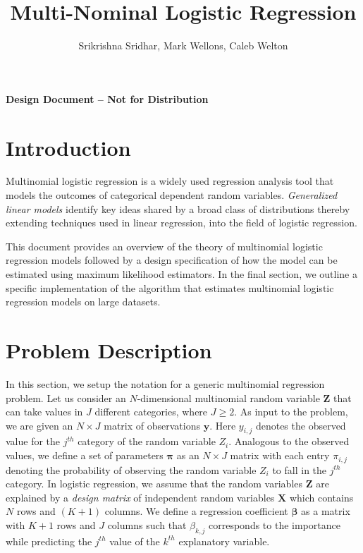 \documentclass[12pt]{article}
\author{Srikrishna Sridhar, Mark Wellons, Caleb Welton}
\title{Multi-Nominal Logistic Regression}
\newcommand{\bS}[1] {\boldsymbol  #1}
\begin{document}
\maketitle
\large
\begin{center}
{\sc \bf Design Document -- Not for Distribution}
\end{center}
\normalsize

 \section{Introduction}\label{sec:intro}
Multinomial logistic regression is a widely used regression analysis tool that models the outcomes of categorical dependent random variables. {\it Generalized linear models} identify key ideas shared by a broad class of distributions thereby extending techniques used in linear regression, into the field of logistic regression. 

This document provides an overview of the theory of multinomial logistic regression models followed by a design specification of how the model can be estimated using maximum likelihood estimators. In the final section, we outline a specific implementation of the algorithm that estimates multinomial logistic regression models on large datasets.

\section{Problem Description}\label{sec:problem}
In this section, we setup the notation for a generic multinomial regression problem. Let us consider an $N$-dimensional multinomial random variable $\bS{Z}$ that can take values in $J$ different categories, where $J \geq 2$. As input to the problem, we are given an $N\times J$ matrix of observations $\bS{y}$. Here $y_{i,j}$ denotes the observed value for the $j^{th}$ category of the random variable $Z_i$.  Analogous to the observed values, we define a set of parameters $\bS{\pi}$  as an $N\times J$ matrix with each entry $\pi_{i,j}$ denoting the probability of observing the random variable $Z_i$ to fall in the $j^{th}$ category. In logistic regression, we assume that the random variables $\bS{Z}$ are explained by a {\it design matrix} of independent random variables $\bS{X}$ which contains $N$ rows and $(K+1)$ columns. We define a regression coefficient $\bS{\beta}$ as a matrix with $K+1$ rows and $J$ columns such that $\beta_{k,j}$ corresponds to the importance while predicting the $j^{th}$ value of the $k^{th}$ explanatory variable.
 
\end{document}
